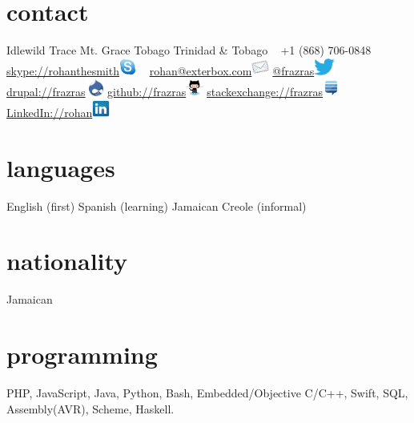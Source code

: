 \documentclass[]{friggeri-cv} %
\begin{document}


\begin{aside} %
\section{contact}
Idlewild Trace
Mt. Grace
Tobago
Trinidad \& Tobago
~
+1 (868) 706-0848
\href {skype://rohanthesmith}{skype://rohanthesmith}\includegraphics[height=16pt]{images/skype.png}
~
\href{mailto:rohan@exterbox.com}{rohan@exterbox.com}\includegraphics[height=16pt]{email.png}
\href{http://twitter.com/frazras}{@frazras}\includegraphics[height=16pt]{twitter.eps}
\href{http://drupal.org/user/34622}{drupal://frazras}\includegraphics[height=16pt]{druplicon.png}
\href {https://github.com/frazras}{github://frazras}\includegraphics[height=16pt]{octocat.png}
\href{http://stackexchange.com/users/530574/frazras?tab=accounts}{stackexchange://frazras}\includegraphics[height=16pt]{stackexchange.png}
\href {http://jm.linkedin.com/in/rohansmith}{LinkedIn://rohan}\includegraphics[height=16pt]{linkedin.png}
\section{languages}
English (first)
Spanish (learning)
Jamaican Creole (informal)
\section{nationality}
Jamaican
\section{programming}
 PHP, JavaScript, Java, Python, Bash, Embedded/Objective C/C++, Swift, SQL, Assembly(AVR), Scheme, Haskell.
\end{aside}
\end{document}
